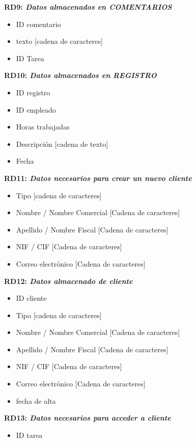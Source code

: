 \documentclass[paper=a4, fontsize=11pt, spanish]{scrartcl}
\begin{document}
\setlength{\parindent}{0em}
\textbf{RD9: \textit{Datos almacenados en COMENTARIOS}}
\setlength{\parindent}{2em}
\begin{itemize}
\item ID comentario
\item texto [cadena de caracteres]
\item ID Tarea
\end{itemize}

\setlength{\parindent}{0em}
\textbf{RD10: \textit{Datos almacenados en REGISTRO}}
\setlength{\parindent}{2em}
\begin{itemize}
\item ID registro
\item ID empleado
\item Horas trabajadas
\item Descripción [cadena de texto]
\item Fecha
\end{itemize}

\setlength{\parindent}{0em}
\textbf{RD11: \textit{ Datos necesarios para crear un nuevo cliente}}
\setlength{\parindent}{2em}
\begin{itemize}
\item Tipo [cadena de caracteres]
\item Nombre / Nombre Comercial [Cadena de caracteres]
\item Apellido / Nombre Fiscal [Cadena de caracteres]
\item NIF / CIF [Cadena de caracteres]
\item Correo electrónico [Cadena de caracteres]
\end{itemize}

\setlength{\parindent}{0em}
\textbf{RD12: \textit{Datos almacenado de cliente}}
\setlength{\parindent}{2em}
\begin{itemize}
\item ID cliente
\item Tipo [cadena de caracteres]
\item Nombre / Nombre Comercial [Cadena de caracteres]
\item Apellido / Nombre Fiscal [Cadena de caracteres]
\item NIF / CIF [Cadena de caracteres]
\item Correo electrónico [Cadena de caracteres]
\item fecha de alta
\end{itemize}

\setlength{\parindent}{0em}
\textbf{RD13: \textit{Datos necesarios para acceder a cliente}}
\setlength{\parindent}{2em}
\begin{itemize}
\item ID tarea
\end{itemize}
\end{document}
